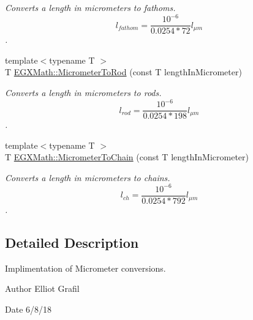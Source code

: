 \begin{DoxyCompactItemize}
\begin{DoxyCompactList}\small\item\em Converts a length in micrometers to fathoms. \[ l_{fathom}= \frac{10^{-6}}{0.0254 * 72} l_{\mu m} \]. \end{DoxyCompactList}\item 
{\footnotesize template$<$typename T $>$ }\\T \mbox{\hyperlink{group___e_g_x_math-_conversions-_length_conversions-_s_i-_micrometer-_surveyors_ga86e147ebc58116be9c15a873451ac156}{E\+G\+X\+Math\+::\+Micrometer\+To\+Rod}} (const T length\+In\+Micrometer)
\begin{DoxyCompactList}\small\item\em Converts a length in micrometers to rods. \[ l_{rod}= \frac{10^{-6}}{0.0254 * 198} l_{\mu m} \]. \end{DoxyCompactList}\item 
{\footnotesize template$<$typename T $>$ }\\T \mbox{\hyperlink{group___e_g_x_math-_conversions-_length_conversions-_s_i-_micrometer-_surveyors_ga0462dc1021b3979ea0d83113aedbbc4c}{E\+G\+X\+Math\+::\+Micrometer\+To\+Chain}} (const T length\+In\+Micrometer)
\begin{DoxyCompactList}\small\item\em Converts a length in micrometers to chains. \[ l_{ch}= \frac{10^{-6}}{0.0254 * 792} l_{\mu m} \]. \end{DoxyCompactList}\end{DoxyCompactItemize}


\subsection{Detailed Description}
Implimentation of Micrometer conversions. 

\begin{DoxyAuthor}{Author}
Elliot Grafil 
\end{DoxyAuthor}
\begin{DoxyDate}{Date}
6/8/18 
\end{DoxyDate}
